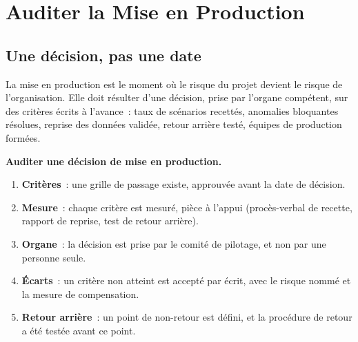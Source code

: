 \section{Auditer la Mise en Production}
\label{sec:c19-production}

\subsection{Une décision, pas une date}

La mise en production est le moment où le risque du projet devient le
risque de l'organisation. Elle doit résulter d'une décision, prise par
l'organe compétent, sur des critères écrits à l'avance~: taux de scénarios
recettés, anomalies bloquantes résolues, reprise des données validée,
retour arrière testé, équipes de production formées.

\begin{boxprocedure}
\textbf{Auditer une décision de mise en production.}
\begin{enumerate}
    \item \textbf{Critères}~: une grille de passage existe, approuvée avant
          la date de décision.
    \item \textbf{Mesure}~: chaque critère est mesuré, pièce à l'appui
          (procès-verbal de recette, rapport de reprise, test de retour
          arrière).
    \item \textbf{Organe}~: la décision est prise par le comité de pilotage,
          et non par une personne seule.
    \item \textbf{Écarts}~: un critère non atteint est accepté par écrit,
          avec le risque nommé et la mesure de compensation.
    \item \textbf{Retour arrière}~: un point de non-retour est défini, et la
          procédure de retour a été testée avant ce point.
\end{enumerate}
\end{boxprocedure}

